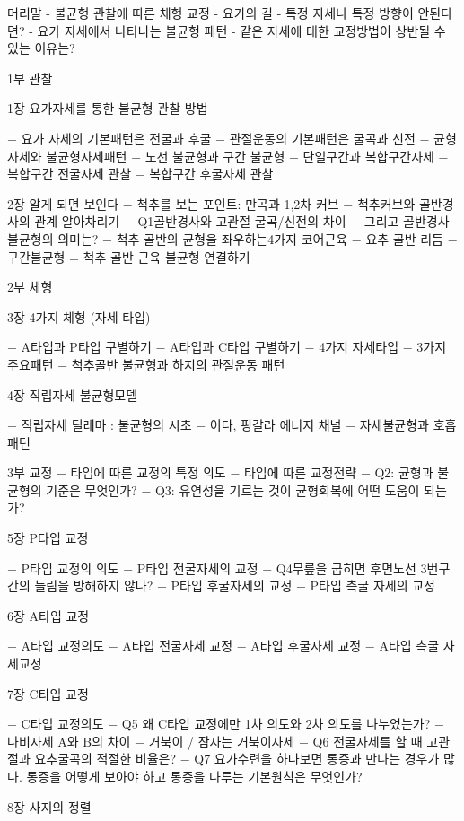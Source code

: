 \documentclass[12pt, a4paper, oneside]{book}
\begin{document}
머리말 
- 불균형 관찰에 따른 체형 교정 
- 요가의 길 
- 특정 자세나 특정 방향이 안된다면? 
- 요가 자세에서 나타나는 불균형 패턴 
- 같은 자세에 대한 교정방법이 상반될 수 있는 이유는? 

1부 관찰 

1장 요가자세를 통한 불균형 관찰 방법 

$-$ 요가 자세의 기본패턴은 전굴과 후굴 
$-$ 관절운동의 기본패턴은 굴곡과 신전 
$-$ 균형자세와 불균형자세패턴 
$-$ 노선 불균형과 구간 불균형 
$-$ 단일구간과 복합구간자세 
$-$ 복합구간 전굴자세 관찰 
$-$ 복합구간 후굴자세 관찰 

2장 알게 되면 보인다 
$-$ 척추를 보는 포인트: 만곡과 1,2차 커브 
$-$ 척추커브와 골반경사의 관계 알아차리기 
$-$ Q1골반경사와 고관절 굴곡/신전의 차이 
$-$ 그리고 골반경사 불균형의 의미는? 
$-$ 척추 골반의 균형을 좌우하는4가지 코어근육 
$-$ 요추 골반 리듬 
$-$ 구간불균형 = 척추 골반 근육 불균형 연결하기 

2부 체형 

3장 4가지 체형 (자세 타입) 

$-$ A타입과 P타입 구별하기 
$-$ A타입과 C타입 구별하기 
$-$ 4가지 자세타입 
$-$ 3가지 주요패턴 
$-$ 척추골반 불균형과 하지의 관절운동 패턴 

4장 직립자세 불균형모델 

$-$ 직립자세 딜레마 : 불균형의 시초 
$-$ 이다, 핑갈라 에너지 채널 
$-$ 자세불균형과 호흡패턴 

3부 교정 
$-$ 타입에 따른 교정의 특정 의도 
$-$ 타입에 따른 교정전략 
$-$ Q2: 균형과 불균형의 기준은 무엇인가? 
$-$ Q3: 유연성을 기르는 것이 균형회복에 어떤 도움이 되는가? 

5장 P타입 교정 

$-$ P타입 교정의 의도 
$-$ P타입 전굴자세의 교정 
$-$ Q4무릎을 굽히면 후면노선 3번구간의 늘림을 방해하지 않나? 
$-$ P타입 후굴자세의 교정 
$-$ P타입 측굴 자세의 교정 

6장 A타입 교정 

$-$ A타입 교정의도 
$-$ A타입 전굴자세 교정 
$-$ A타입 후굴자세 교정 
$-$ A타입 측굴 자세교정 

7장 C타입 교정 

$-$ C타입 교정의도 
$-$ Q5 왜 C타입 교정에만 1차 의도와 2차 의도를 나누었는가? 
$-$ 나비자세 A와 B의 차이 
$-$ 거북이 / 잠자는 거북이자세 
$-$ Q6 전굴자세를 할 때 고관절과 요추굴곡의 적절한 비율은? 
$-$ Q7 요가수련을 하다보면 통증과 만나는 경우가 많다. 통증을 어떻게 보아야 하고 통증을 다루는 기본원칙은 무엇인가? 

8장 사지의 정렬 
\end{document}
